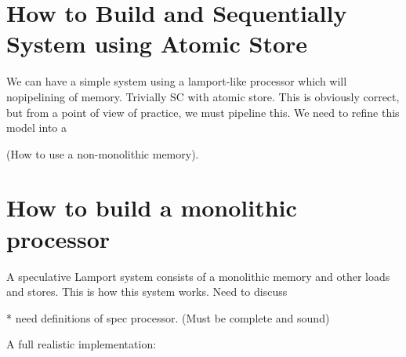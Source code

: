 \section{How to Build and Sequentially System using Atomic Store}

We can have a simple system using a lamport-like processor which will nopipelining of memory. Trivially SC with atomic store. This is obviously correct, but from a point of view of practice, we must pipeline this. We need to refine this model into a

(How to use a non-monolithic memory).

\section{How to build a monolithic processor}

A speculative Lamport system consists of a monolithic memory and other loads and stores. This is how this system works. Need to discuss 

* need definitions of spec processor. (Must be complete and sound)

A full realistic implementation:



